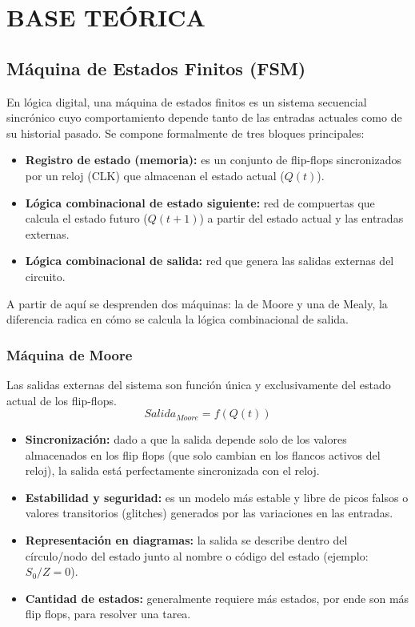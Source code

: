 \section{BASE TEÓRICA}
\subsection{Máquina de Estados Finitos (FSM)}
\sangria{} En lógica digital, una máquina de estados finitos es un sistema secuencial sincrónico cuyo comportamiento depende tanto de las entradas actuales como de su historial pasado. Se compone formalmente de tres bloques principales:
\begin{itemize}[nosep]
	\item \textbf{Registro de estado (memoria):} es un conjunto de flip-flops sincronizados por un reloj (CLK) que almacenan el estado actual ($Q(t)$).
	\item \textbf{Lógica combinacional de estado siguiente:} red de compuertas que calcula el estado futuro ($Q(t+1)$) a partir del estado actual y las entradas externas.
	\item \textbf{Lógica combinacional de salida:} red que genera las salidas externas del circuito.
\end{itemize}
\hspace{5pt}
\sangria{} A partir de aquí se desprenden dos máquinas: la de Moore y una de Mealy, la diferencia radica en cómo se calcula la lógica combinacional de salida.
\subsubsection{Máquina de Moore}
\sangria{} Las salidas externas del sistema son función única y exclusivamente del estado actual de los flip-flops.
{\Large
\[
	Salida_{Moore} = f(Q(t))
\]
}
\begin{itemize}[nosep]
	\item\textbf{Sincronización:} dado a que la salida depende solo de los valores almacenados en los flip flops (que solo cambian en los flancos activos del reloj), la salida está perfectamente sincronizada con el reloj.
	\item\textbf{Estabilidad y seguridad:} es un modelo más estable y libre de picos falsos o valores transitorios (glitches) generados por las variaciones en las entradas.
	\item\textbf{Representación en diagramas:} la salida se describe dentro del círculo/nodo del estado junto al nombre o código del estado (ejemplo: $S_0/Z = 0$).
	\item\textbf{Cantidad de estados:} generalmente requiere más estados, por ende son más flip flops, para resolver una tarea.
\end{itemize}

